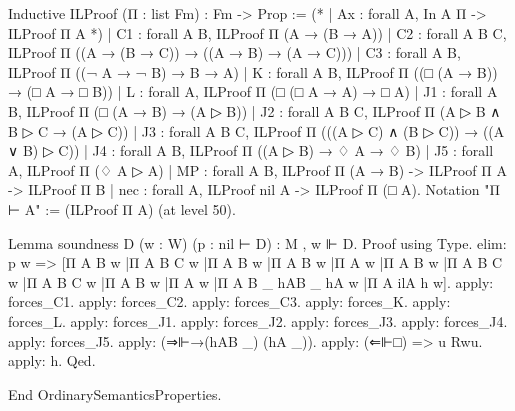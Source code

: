 \begin{spverbatim}
Inductive ILProof (Π : list Fm) : Fm -> Prop :=
  (* | Ax : forall {A}, In A Π -> ILProof Π A *)
  | C1 : forall {A B}, ILProof Π (A → (B → A))
  | C2 : forall {A B C}, ILProof Π ((A → (B → C)) → ((A → B) → (A → C)))
  | C3 : forall {A B}, ILProof Π ((¬ A → ¬ B) → B → A)
  | K : forall {A B}, ILProof Π ((□ (A → B)) → (□ A → □ B))
  | L : forall {A}, ILProof Π (□ (□ A → A) → □ A)
  | J1 : forall {A B}, ILProof Π (□ (A → B) → (A ▷ B))
  | J2 : forall {A B C}, ILProof Π (A ▷ B ∧ B ▷ C → (A ▷ C))
  | J3 : forall {A B C}, ILProof Π (((A ▷ C) ∧ (B ▷ C)) → ((A ∨ B) ▷ C))
  | J4 : forall {A B},  ILProof Π ((A ▷ B) → ♢ A → ♢ B)
  | J5 : forall {A},  ILProof Π (♢ A ▷ A)
  | MP : forall {A B}, ILProof Π (A → B) -> ILProof Π A -> ILProof Π B
  | nec : forall {A}, ILProof nil A -> ILProof Π (□ A).
Notation "Π ⊢ A" := (ILProof Π A) (at level 50).

Lemma soundness {D} (w : W) (p : nil ⊢ D) : M , w ⊩ D.
Proof using Type.
  elim: p w => [Π A B w
         |Π A B C w
         |Π A B w
         |Π A B w
         |Π A w
         |Π A B w
         |Π A B C w
         |Π A B C w
         |Π A B w
         |Π A w
         |Π A B _ hAB _ hA w
         |Π A ilA h w].
  apply: forces_C1.
  apply: forces_C2.
  apply: forces_C3.
  apply: forces_K.
  apply: forces_L.
  apply: forces_J1.
  apply: forces_J2.
  apply: forces_J3.
  apply: forces_J4.
  apply: forces_J5.
  apply: (⇒⊩→(hAB _) (hA _)).
  apply: (⇐⊩□) => u Rwu. apply: h.
Qed.

End OrdinarySemanticsProperties.
\end{spverbatim}
